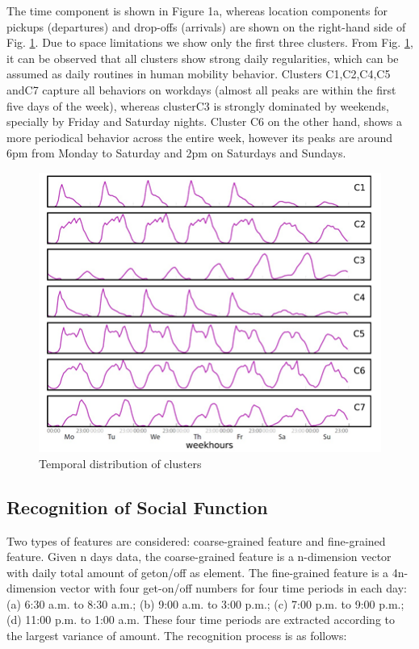 \documentclass[a4paper, 10pt, conference]{ieeeconf}      %
\begin{document}
The time component is shown in Figure 1a, whereas location components for pickups (departures) and drop-offs (arrivals) are shown on the right-hand side of Fig. \ref{fig:my_png_9}. Due to space limitations we show only the first three clusters. From Fig. \ref{fig:my_png_9}, it can be observed that all clusters show strong daily regularities, which can be assumed as daily routines in human mobility behavior. Clusters C1,C2,C4,C5 andC7 capture all behaviors on workdays (almost all peaks are within the first five days of the week), whereas clusterC3 is strongly dominated by weekends, specially by Friday and Saturday nights. Cluster C6 on the other hand, shows a more periodical behavior across the entire week, however its peaks are around 6pm from Monday to Saturday and 2pm on Saturdays and Sundays.

\begin{figure}[ht]
    \centering
    \includegraphics{fig/png9.png}
    \caption{Temporal distribution of clusters}
    \label{fig:my_png_9}
\end{figure}

\subsection{Recognition of Social Function}Two types of features are considered: coarse-grained feature and fine-grained feature. Given n days data, the coarse-grained feature is a n-dimension vector with daily total amount of geton/off as element. The fine-grained feature is a 4n-dimension vector with four get-on/off numbers for four time periods in each day: (a) 6:30 a.m. to 8:30 a.m.; (b) 9:00 a.m. to 3:00 p.m.; (c) 7:00 p.m. to 9:00 p.m.; (d) 11:00 p.m. to 1:00 a.m. These four time periods are extracted according to the largest variance of amount. The recognition process is as follows:
\end{document}
